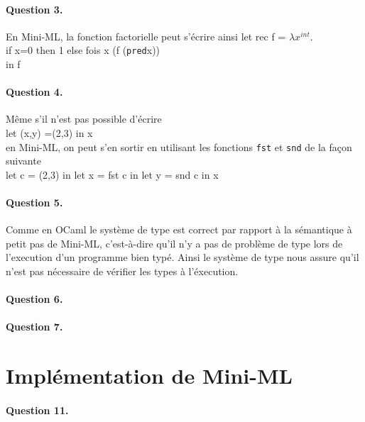 \documentclass{article}
\theoremstyle{thm}
\theoremstyle{def}
\theoremstyle{dem}
\newcommand{\code}[1]{\texttt{#1}}
\begin{document}
	\paragraph{Question 3.}
	En Mini-ML, la fonction factorielle peut s'écrire ainsi
	let rec f = $\lambda x^{int}$.\\
	if x=0 then 1 else fois x (f (\code{pred}x))\\
	in f\\

	\paragraph{Question 4.}
	Même s'il n'est pas possible d'écrire\\
	let (x,y) =(2,3) in x\\
	en Mini-ML, on peut s'en sortir en utilisant les fonctions \code{fst} et \code{snd} de la façon suivante\\
	let c = (2,3) in let x = fst c in let y = snd c in x

	\paragraph{Question 5.}
	Comme en OCaml le système de type est correct par rapport à la sémantique à petit pas de Mini-ML, c'est-à-dire qu'il n'y a pas de problème de type lors de l'execution d'un programme bien typé. Ainsi le système de type nous assure qu'il n'est pas nécessaire de vérifier les types à l'éxecution.

	\paragraph{Question 6.}

	\paragraph{Question 7.}

	\section{Implémentation de Mini-ML}
	\paragraph{Question 11.}
\end{document}
